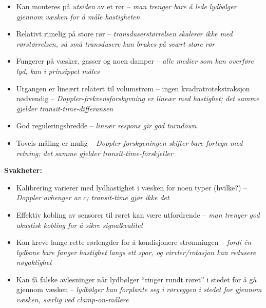 \begin{itemize}
\item{} Kan monteres på \textit{utsiden} av et rør -- \textit{man trenger bare å lede lydbølger gjennom væsken for å måle hastigheten}
\item{} Relativt rimelig på store rør -- \textit{transduserstørrelsen skalerer ikke med rørstørrelsen, så små transdusere kan brukes på svært store rør}
\item{} Fungerer på væsker, gasser og noen damper -- \textit{alle medier som kan overføre lyd, kan i prinsippet måles}
\item{} Utgangen er lineært relatert til volumstrøm -- ingen kvadratrotekstraksjon nødvendig -- \textit{Doppler-frekvensforskyvning er lineær med hastighet; det samme gjelder transit-time-differansen}
\item{} God reguleringsbredde -- \textit{lineær respons gir god turndown}
\item{} Toveis måling er mulig -- \textit{Doppler-forskyvningen skifter bare fortegn med retning; det samme gjelder transit-time-forskjeller}
\end{itemize}

\vskip 10pt

{\bf Svakheter:}

\begin{itemize}
\item{} Kalibrering varierer med lydhastighet i væsken for noen typer (hvilke?) -- \textit{Doppler avhenger av $c$; transit-time gjør ikke det}
\item{} Effektiv kobling av sensorer til røret kan være utfordrende -- \textit{man trenger god akustisk kobling for å sikre signalkvalitet}
\item{} Kan kreve lange rette rørlengder for å kondisjonere strømningen -- \textit{fordi én lydbane bare fanger hastighet langs ett spor, og virvler/rotasjon kan redusere nøyaktighet}
\item{} Kan få falske avlesninger når lydbølger ``ringer rundt røret'' i stedet for å gå gjennom væsken -- \textit{lydbølger kan forplante seg i rørveggen i stedet for gjennom væsken, særlig ved clamp-on-målere}
\end{itemize}




